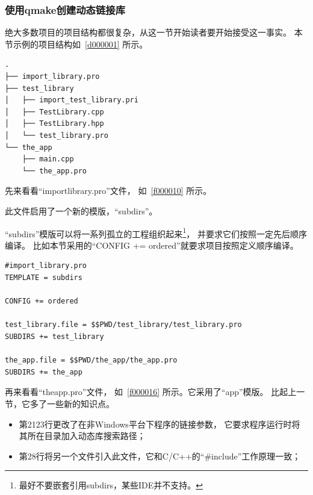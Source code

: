 %
% 

\subsubsection{
使用qmake创建动态链接库
}\label{ss000710}


绝大多数项目的项目结构都很复杂，从这一节开始读者要开始接受这一事实。
本节示例的项目结构如\treeindexnumbernameone\ \ref{d000001}
所示。

\label{d000001}    %
\begin{lstlisting}[caption=GoodLuck,
numbers=none,
title=\treeindexnumbernameone \thetreeindexnumber
]
.
├── import_library.pro
├── test_library
│   ├── import_test_library.pri
│   ├── TestLibrary.cpp
│   ├── TestLibrary.hpp
│   └── test_library.pro
└── the_app
    ├── main.cpp
    └── the_app.pro
\end{lstlisting}          %


先来看看“import\underline{\hspace{0.5em}}library.pro”文件，
如\lstlistingname\ \ref{f000010}
所示。

此文件启用了一个新的模版，“subdirs”。

“subdirs”模版可以将一系列孤立的工程组织起来\footnote{
最好不要嵌套引用subdirs，某些IDE并不支持。
}，
并要求它们按照一定先后顺序编译。
比如本节采用的“CONFIG {\sourcefonttwo{}+}{\sourcefonttwo{}=} ordered”就要求项目按照定义顺序编译。

\begin{lstlisting}[label=f000010,
caption=GoodLuck,
title=\lstlistingname\ \thelstlisting
]
#import_library.pro
TEMPLATE = subdirs

CONFIG += ordered

test_library.file = $$PWD/test_library/test_library.pro
SUBDIRS += test_library

the_app.file = $$PWD/the_app/the_app.pro
SUBDIRS += the_app
\end{lstlisting}          %


再来看看“the\underline{\hspace{0.5em}}app.pro”文件，
如\lstlistingname\ \ref{f000016} 所示。它采用了“app”模版。
比起上一节，它多了一些新的知识点。
\begin{itemize}
\item 第21\raisebox{0.16ex}{\sourcefonttwo\~{}}23行更改了在非Windows平台下程序的链接参数，
它要求程序运行时将其所在目录加入动态库搜索路径；
\item 第28行将另一个文件引入此文件，它和C/C{\sourcefonttwo{}+}{\sourcefonttwo{}+}的“{\sourcefonttwo\#}include”工作原理一致；
\end{itemize}

